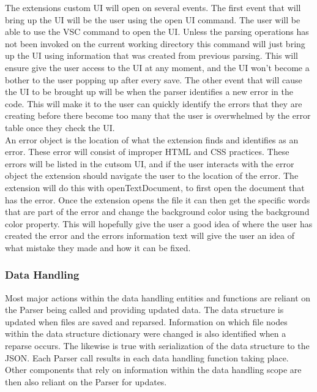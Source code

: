 \documentclass[letterpaper,10pt,titlepage,draftclsnofoot,onecolumn,onesided] {IEEEtran}
\begin{document}
	The extensions custom UI will open on several events. 
	The first event that will bring up the UI will be the user using the open UI command. 
	The user will be able to use the VSC command to open the UI. 
	Unless the parsing operations has not been invoked on the current working directory this command will just bring up the UI using information that was created from previous parsing. 
	This will ensure give the user access to the UI at any moment, and the UI won't become a bother to the user popping up after every save. 
	The other event that will cause the UI to be brought up will be when the parser identifies a new error in the code.	
	This will make it to the user can quickly identify the errors that they are creating before there become too many that the user is overwhelmed by the error table once they check the UI. \\

	An error object is the location of what the extension finds and identifies as an error.
	These error will consist of improper HTML and CSS practices. 
	These errors will be listed in the cutsom UI, and if the user interacts with the error object the extension should navigate the user to the location of the error.
	The extension will do this with openTextDocument, to first open the document that has the error. 
	Once the extension opens the file it can then get the specific words that are part of the error and change the background color using the background color property.
	This will hopefully give the user a good idea of where the user has created the error and the errors information text will give the user an idea of what mistake they made and how it can be fixed.

	\subsubsection{Data Handling}
	Most major actions within the data handling entities and functions are reliant on the Parser being called and providing updated data.
	The data structure is updated when files are saved and reparsed. 
	Information on which file nodes within the data structure dictionary were changed is also identified when a reparse occurs.
	The likewise is true with serialization of the data structure to the JSON.
	Each Parser call results in each data handling function taking place. 
	Other components that rely on information within the data handling scope are then also reliant on the Parser for updates.
	
\end{document}
